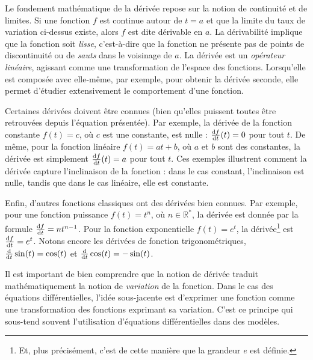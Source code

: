         Le fondement mathématique de la dérivée repose sur la notion de continuité et de limites. Si une fonction $f$ est continue autour de $t = a$ et que la limite du taux de variation ci-dessus existe, alors $f$ est dite dérivable en $a$. La dérivabilité implique que la fonction soit \textit{lisse}, c'est-à-dire que la fonction ne présente pas de points de discontinuité ou de \textit{sauts} dans le voisinage de $a$. La dérivée est un \textit{opérateur linéaire}, agissant comme une transformation de l'espace des fonctions. Lorsqu'elle est composée avec elle-même, par exemple, pour obtenir la dérivée seconde, elle permet d'étudier extensivement le comportement d'une fonction.
        
        Certaines dérivées doivent être connues (bien qu'elles puissent toutes être retrouvées depuis l'équation présentée). Par exemple, la dérivée de la fonction constante $f(t) = c$, où $c$ est une constante, est nulle : $\frac {\mathrm d{f}}{\mathrm d{t}}(t) = 0$ pour tout $t$. De même, pour la fonction linéaire $f(t) = at + b$, où $a$ et $b$ sont des constantes, la dérivée est simplement $\frac {\mathrm d{f}}{\mathrm d{t}}(t) = a$ pour tout $t$. Ces exemples illustrent comment la dérivée capture l'inclinaison de la fonction : dans le cas constant, l'inclinaison est nulle, tandis que dans le cas linéaire, elle est constante.
        
        Enfin, d'autres fonctions classiques ont des dérivées bien connues. Par exemple, pour une fonction puissance $f(t) = t^n$, où $n \in \mathbb R^*$, la dérivée est donnée par la formule $\frac {\mathrm d{f}}{\mathrm d{t}} = nt^{n-1}$. Pour la fonction exponentielle $f(t) = e^t$, la dérivée\footnote{Et, plus précisément, c'est de cette manière que la grandeur $e$ est définie.} est $\frac {\mathrm d{f}}{\mathrm d{t}} = e^t$. Notons encore les dérivées de fonction trigonométriques, $\frac {\mathrm d{}}{\mathrm d{t}}\sin(t) = \cos(t)$ et $\frac {\mathrm d{}}{\mathrm d{t}}\cos(t) = -\sin(t)$.

        Il est important de bien comprendre que la notion de dérivée traduit mathématiquement la notion de \textit{variation} de la fonction. Dans le cas des équations différentielles, l'idée sous-jacente est d'exprimer une fonction comme une transformation des fonctions exprimant sa variation. C'est ce principe qui sous-tend souvent l'utilisation d'équations différentielles dans des modèles.
        
